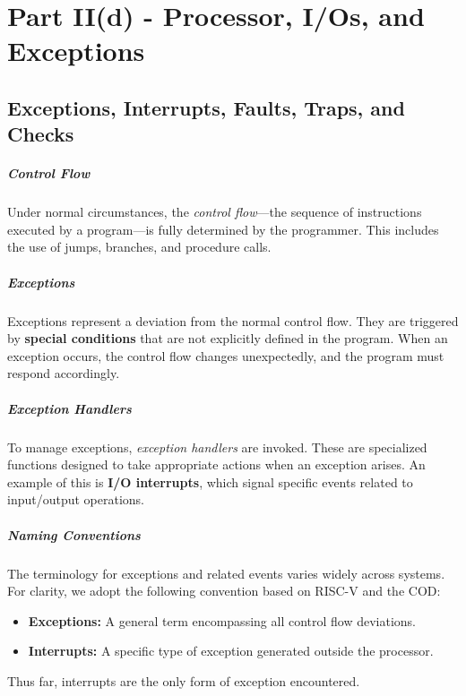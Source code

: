 \chapter{Part II(d) - Processor, I/Os, and Exceptions}

\section{Exceptions, Interrupts, Faults, Traps, and Checks}

\paragraph{Control Flow}
Under normal circumstances, the \textit{control flow}—the sequence of instructions executed by a program—is fully determined by the programmer. This includes the use of jumps, branches, and procedure calls.

\paragraph{Exceptions}
Exceptions represent a deviation from the normal control flow. They are triggered by \textbf{special conditions} that are not explicitly defined in the program. When an exception occurs, the control flow changes unexpectedly, and the program must respond accordingly.

\paragraph{Exception Handlers}
To manage exceptions, \textit{exception handlers} are invoked. These are specialized functions designed to take appropriate actions when an exception arises. An example of this is \textbf{I/O interrupts}, which signal specific events related to input/output operations.

\paragraph{Naming Conventions}
The terminology for exceptions and related events varies widely across systems. For clarity, we adopt the following convention based on RISC-V and the COD:
\begin{itemize}
    \item \textbf{Exceptions:} A general term encompassing all control flow deviations.
    \item \textbf{Interrupts:} A specific type of exception generated outside the processor.
\end{itemize}
Thus far, interrupts are the only form of exception encountered.

